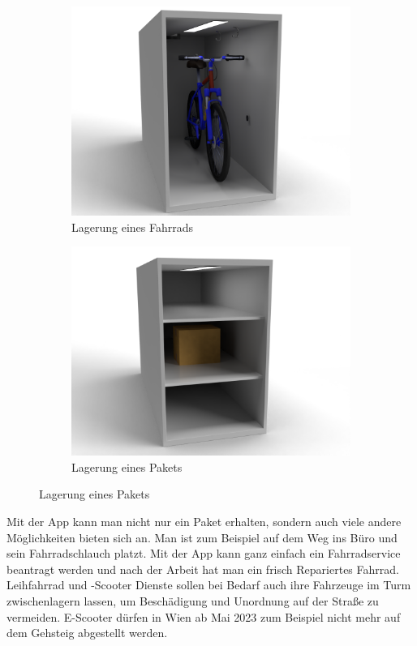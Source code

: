 \begin{figure}[!ht]
  \centering
  \begin{subfigure}{0.4\textwidth}
    \centering
    \includegraphics[width=\textwidth]{images/box_bike.png}
    \caption{Lagerung eines Fahrrads}
    \label{fig:storing_bike}
  \end{subfigure}
  \begin{subfigure}{0.4\textwidth}
    \centering
    \includegraphics[width=\textwidth]{images/box_item.png}
    \caption{Lagerung eines Pakets}
    \label{fig:storing_item}
  \end{subfigure}
\end{figure}

Mit der App kann man nicht nur ein Paket erhalten, sondern auch viele andere Möglichkeiten bieten sich an. Man ist zum Beispiel auf dem Weg ins Büro und sein Fahrradschlauch platzt. Mit der App kann ganz einfach ein Fahrradservice beantragt werden und nach der Arbeit hat man ein frisch Repariertes Fahrrad. Leihfahrrad und -Scooter Dienste sollen bei Bedarf auch ihre Fahrzeuge im Turm zwischenlagern lassen, um Beschädigung und Unordnung auf der Straße zu vermeiden. E-Scooter dürfen in Wien ab Mai 2023 zum Beispiel nicht mehr auf dem Gehsteig abgestellt werden\cite{krutzler_wien_2022}.
